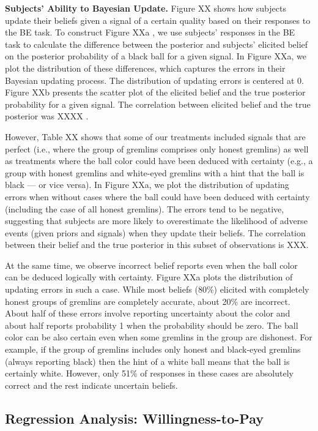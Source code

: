 \documentclass[12pt,a4paper]{article}
\begin{document}
\textbf{Subjects’ Ability to Bayesian Update.} Figure XX shows how subjects update their beliefs given a signal of a certain quality based on their responses to the BE task. To construct Figure XXa , we use subjects’ responses in the BE task to calculate the difference between the posterior and subjects’ elicited belief on the posterior probability of a black ball for a given signal. In Figure XXa, we plot the distribution of these differences, which captures the errors in their Bayesian updating process. The distribution of updating errors is centered at 0. Figure XXb presents the scatter plot of the elicited belief and the true posterior probability for a given signal. The correlation between elicited belief and the true posterior was XXXX . 

However, Table XX shows that some of our treatments included signals that are perfect (i.e., where the group of gremlins comprises only honest gremlins) as well as treatments where the ball color could have been deduced with certainty (e.g., a group with honest gremlins and white-eyed gremlins with a hint that the ball is black — or vice versa). In Figure XXa, we plot the distribution of updating errors when without cases where the ball could have been deduced with certainty (including the case of all honest gremlins). The errors tend to be negative, suggesting that subjects are more likely to overestimate the likelihood of adverse events (given priors and signals) when they update their beliefs. The correlation between their belief and the true posterior in this subset of observations is XXX.
 
At the same time, we observe incorrect belief reports even when the ball color can be deduced logically with certainty. Figure XXa plots the distribution of updating errors in such a case. While most beliefs (80\%) elicited with completely honest groups of gremlins are completely accurate, about 20\% are incorrect. About half of these errors involve reporting uncertainty about the color and about half reports probability 1 when the probability should be zero. The ball color can be also certain even when some gremlins in the group are dishonest. For example, if the group of gremlins includes only honest and black-eyed gremlins (always reporting black) then the hint of a white ball means that the ball is certainly white. However, only 51\% of responses in these cases are absolutely correct and the rest indicate uncertain beliefs. 

\subsection{Regression Analysis: Willingness-to-Pay}
\end{document}
